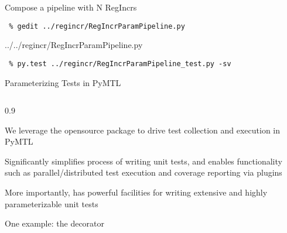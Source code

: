 \begin{task}\begin{frame}[fragile]{Compose a pipeline with N RegIncrs}

\vspace{-0.15in}
\begin{Verbatim}[commandchars=\\\{\}]
 % cd \midtilde/pymtl-tut/build
 % gedit ../regincr/RegIncrParamPipeline.py
\end{Verbatim}
\vspace{-0.17in}

%
{../../regincr/RegIncrParamPipeline.py}

\vspace{-0.2in}
\begin{Verbatim}
 % py.test ../regincr/RegIncrParamPipeline_test.py -sv
\end{Verbatim}

\end{frame}
\end{task}

\begin{frame}{Parameterizing Tests in PyMTL}

\medskip
\begin{cbxcols}
\begin{column}{0.9\tw}
\begin{cbxlist}

  \1 We leverage the opensource  package to drive test
     collection and execution in PyMTL

  \1 Significantly simplifies process of writing unit tests, and enables
     functionality such as parallel/distributed test execution and
     coverage reporting via plugins

  \1 More importantly,  has powerful facilities for writing
     extensive and highly parameterizable unit tests

  \1 One example: the  decorator

\end{cbxlist}
\end{column}
\end{cbxcols}
\end{frame}

